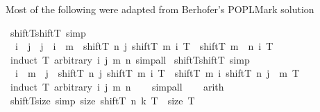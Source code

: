 \begin{isabellebody}
\begin{isamarkuptext}%
Most of the following were adapted from Berhofer's POPLMark solution%
\end{isamarkuptext}\isamarkuptrue%
\isamarkupfalse%
\ shiftT{\isacharunderscore}{\kern0pt}shiftT\ {\isacharbrackleft}{\kern0pt}simp{\isacharbrackright}{\kern0pt}{\isacharcolon}{\kern0pt}\isanewline
\ \ {\isachardoublequoteopen}i\ {\isasymle}\ j\ {\isasymLongrightarrow}\ j\ {\isasymle}\ i\ {\isacharplus}{\kern0pt}\ m\ {\isasymLongrightarrow}\ shiftT\ n\ j\ {\isacharparenleft}{\kern0pt}shiftT\ m\ i\ T{\isacharparenright}{\kern0pt}\ {\isacharequal}{\kern0pt}\ shiftT\ {\isacharparenleft}{\kern0pt}m\ {\isacharplus}{\kern0pt}\ n{\isacharparenright}{\kern0pt}\ i\ T{\isachardoublequoteclose}\isanewline
%
\isadelimproof
\ \ %
\endisadelimproof
%
\isatagproof
{}\isamarkupfalse%
\ {\isacharparenleft}{\kern0pt}induct\ T\ arbitrary{\isacharcolon}{\kern0pt}\ i\ j\ m\ n{\isacharparenright}{\kern0pt}\ simp{\isacharunderscore}{\kern0pt}all%
\endisatagproof
{\isafoldproof}%
%
\isadelimproof
\isanewline
%
\endisadelimproof
\isanewline
{}\isamarkupfalse%
\ shiftT{\isacharunderscore}{\kern0pt}shiftT{\isacharprime}{\kern0pt}\ {\isacharbrackleft}{\kern0pt}simp{\isacharbrackright}{\kern0pt}{\isacharcolon}{\kern0pt}\isanewline
\ \ {\isachardoublequoteopen}i\ {\isacharplus}{\kern0pt}\ m\ {\isasymle}\ j\ {\isasymLongrightarrow}\ shiftT\ n\ j\ {\isacharparenleft}{\kern0pt}shiftT\ m\ i\ T{\isacharparenright}{\kern0pt}\ {\isacharequal}{\kern0pt}\ shiftT\ m\ i\ {\isacharparenleft}{\kern0pt}shiftT\ n\ {\isacharparenleft}{\kern0pt}j\ {\isacharminus}{\kern0pt}\ m{\isacharparenright}{\kern0pt}\ T{\isacharparenright}{\kern0pt}{\isachardoublequoteclose}\isanewline
%
\isadelimproof
\ \ %
\endisadelimproof
%
\isatagproof
{}\isamarkupfalse%
\ {\isacharparenleft}{\kern0pt}induct\ T\ arbitrary{\isacharcolon}{\kern0pt}\ i\ j\ m\ n{\isacharparenright}{\kern0pt}\isanewline
\ \ \isamarkupfalse%
\ simp{\isacharunderscore}{\kern0pt}all\isanewline
\ \ \isamarkupfalse%
\ arith\isanewline
\isanewline
\ \ \isamarkupfalse%
%
\endisatagproof
{\isafoldproof}%
%
\isadelimproof
\isanewline
%
\endisadelimproof
\isanewline
{}\isamarkupfalse%
\ shiftT{\isacharunderscore}{\kern0pt}size\ {\isacharbrackleft}{\kern0pt}simp{\isacharbrackright}{\kern0pt}{\isacharcolon}{\kern0pt}\ {\isachardoublequoteopen}size\ {\isacharparenleft}{\kern0pt}shiftT\ n\ k\ T{\isacharparenright}{\kern0pt}\ {\isacharequal}{\kern0pt}\ size\ T{\isachardoublequoteclose}\isanewline

\end{isabellebody}
